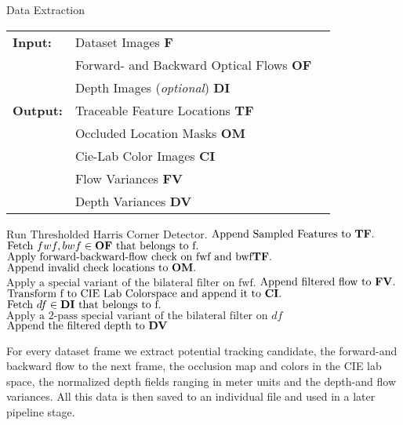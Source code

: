 \begin{algorithm}[H]
\caption{Data Extraction}
\begin{table}[H]
  \begin{tabular}{@{}lll@{}}
    \textbf{Input:} & Dataset Images \bf{F} \\
		& Forward- and Backward Optical Flows \bf{OF} \\
 		& Depth Images (\emph{optional}) \bf{DI} \\
    \textbf{Output:} & Traceable Feature Locations \bf{TF} \\
    & Occluded Location Masks \bf{OM}\\
    & Cie-Lab Color Images \bf{CI} \\
    & Flow Variances \bf{FV} \\
    & Depth Variances \bf{DV} \\
    
  \end{tabular} 
\end{table}
\setlength{\fboxrule}{0pt} 
\begin{boxedminipage}{1.0\textwidth}
  \begin{algorithmic}[1]
        \State $\text{Run Thresholded Harris Corner Detector}.$
		\State $\text{Append Sampled Features to } \bf{TF}.$
		\State $\text{Fetch } fwf,bwf \in \bf{OF} \text{ that belongs to f}.$
		\State $\text{Apply forward-backward-flow check on fwf and bwf} \bf{TF}.$
		\State $\text{Append invalid check locations to } \bf{OM}.$
		\State $\text{Apply a special variant of the bilateral filter on fwf}.$
		\State $\text{Append filtered flow to } \bf{FV}.$
		\State $\text{Transform f to CIE Lab Colorspace and append it to } \bf{CI}.$
		\State $\text{Fetch } df \in \bf{DI} \text{ that belongs to f}.$
		\State $\text{Apply a 2-pass special variant of the bilateral filter on } df$
		\State $\text{Append the filtered depth to } \bf{DV}$
      \EndFor
  \end{algorithmic}
  \end{boxedminipage}
  \vskip1.5pt
\label{alg:data_extraction}
\end{algorithm}
For every dataset frame we extract potential tracking candidate, the forward-and backward flow to the next frame, the occlusion map and colors in the CIE lab space, the normalized depth fields ranging in meter units and the depth-and flow variances. All this data is then saved to an individual file and used in a later pipeline stage.
